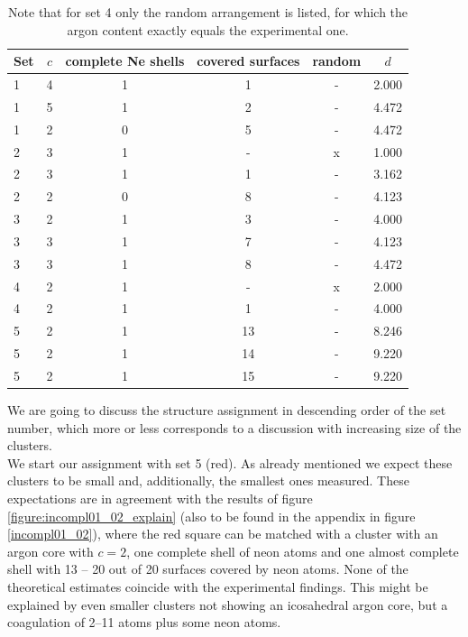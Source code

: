 \begin{table}[!h]
  \caption{Note that for set 4 only the random arrangement is listed,
           for which the argon content exactly equals the experimental one.}
  \centering
  \begin{tabular}{lccccc}
    \toprule
     Set  & $c$ & complete Ne shells & covered surfaces & random & $d$\\
    \midrule
      1   & 4   &          1         &        1         &   -    & 2.000\\
      1   & 5   &          1         &        2         &   -    & 4.472\\
      1   & 2   &          0         &        5         &   -    & 4.472\\
    \midrule
      2   & 3   &          1         &        -         &   x    & 1.000\\
      2   & 3   &          1         &        1         &   -    & 3.162\\
      2   & 2   &          0         &        8         &   -    & 4.123\\
    \midrule
      3   & 2   &          1         &        3         &   -    & 4.000\\
      3   & 3   &          1         &        7         &   -    & 4.123\\
      3   & 3   &          1         &        8         &   -    & 4.472\\
    \midrule
      4   & 2   &          1         &        -         &   x    & 2.000\\
      4   & 2   &          1         &        1         &   -    & 4.000\\
    \midrule
      5   & 2   &          1         &       13         &   -    & 8.246\\
      5   & 2   &          1         &       14         &   -    & 9.220\\
      5   & 2   &          1         &       15         &   -    & 9.220\\
    \bottomrule
  \end{tabular}
  \label{table:assignments}
\end{table}

We are going to discuss the structure assignment in descending order
of the set number, which more or less corresponds to a discussion with
increasing size of the clusters.\\
We start our assignment with set 5 (red). As already mentioned we expect these clusters
to be small and, additionally, the smallest ones measured. These expectations are
in agreement with the results of figure \ref{figure:incompl01_02_explain}
(also to be found in the
appendix in figure \ref{incompl01_02}), where the red square
can be matched with a cluster with an argon core with $c=2$, one complete
shell of neon atoms 
and one almost complete
shell with 13 -- 20 out of 20 surfaces covered by neon atoms. None of the
theoretical estimates coincide with the experimental findings. This might be
explained by even smaller clusters not showing an icosahedral argon core, but
a coagulation of 2--11 atoms plus some neon atoms.

